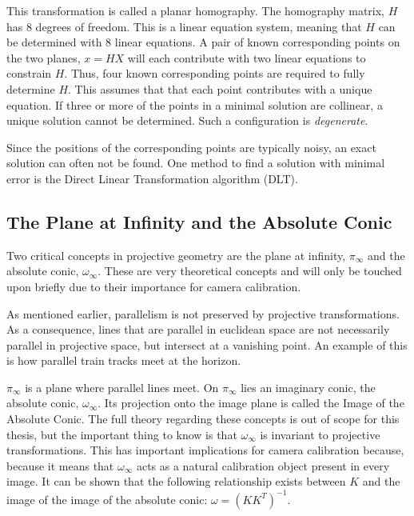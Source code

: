 This transformation is called a planar homography. The homography matrix, $H$ has 8 degrees of freedom. 
This is a linear equation system, meaning that $H$ can be determined with 8 linear equations.
A pair of known corresponding points on the two planes, $x=HX$ will each contribute with two linear equations to constrain $H$.
Thus, four known corresponding points are required to fully determine $H$.
This assumes that that each point contributes with a unique equation.
If three or more of the points in a minimal solution are collinear, a unique solution cannot be determined.
Such a configuration is \textit{degenerate}. \cite[91-92]{hartley-zisserman}

Since the positions of the corresponding points are typically noisy, an exact solution can often not be found.
One method to find a solution with minimal error is the Direct Linear Transformation algorithm (DLT). \cite{homography-estimation}

\subsection{The Plane at Infinity and the Absolute Conic} \label{ac}
Two critical concepts in projective geometry are the plane at infinity, $\pi_{\infty}$ and the absolute conic, $\omega_{\infty}$.
These are very theoretical concepts and will only be touched upon briefly due to their importance for camera calibration.

As mentioned earlier, parallelism is not preserved by projective transformations. %
As a consequence, lines that are parallel in euclidean space are not necessarily parallel in projective space, but intersect at a vanishing point.
An example of this is how parallel train tracks meet at the horizon.

$\pi_{\infty}$ is a plane where parallel lines meet. 
On $\pi_{\infty}$ lies an imaginary conic, the absolute conic, $\omega_{\infty}$.
Its projection onto the image plane is called the Image of the Absolute Conic.
The full theory regarding these concepts is out of scope for this thesis, but the important thing to know is that $\omega_{\infty}$ is invariant to projective transformations.
This has important implications for camera calibration because, because it means that $\omega_{\infty}$ acts as a natural calibration object present in every image.
It can be shown that the following relationship exists between $K$ and the image of the image of the absolute conic:
$\omega = (KK^T)^{-1}$. \cite[210]{hartley-zisserman}\cite{pollefeys}

